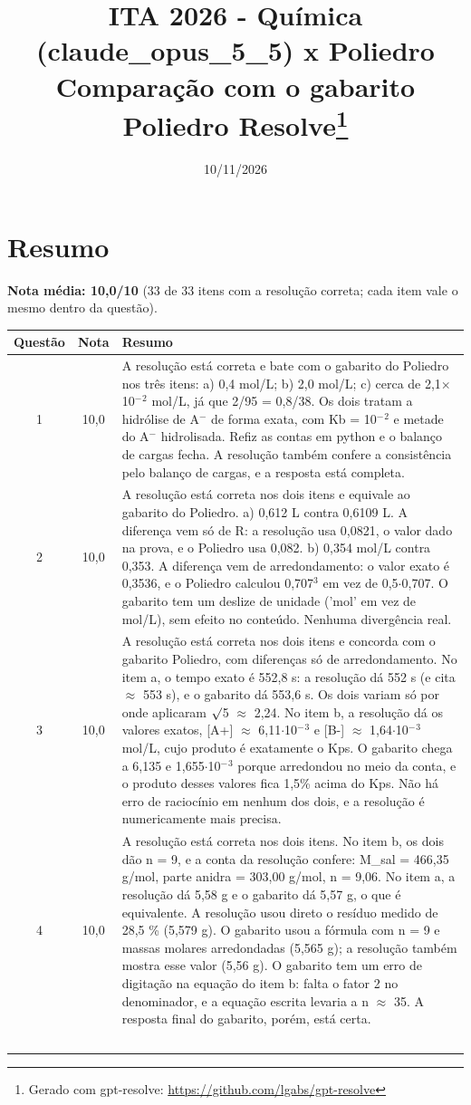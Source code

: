\documentclass{article}%
\title{ITA 2026 {-} Química (claude\_opus\_5\_5) x Poliedro\\[4pt]\large Comparação com o gabarito Poliedro Resolve\thanks{Gerado com gpt-resolve: \url{https://github.com/lgabs/gpt-resolve}}}%
\date{10/11/2026}%
\begin{document}
%
\normalsize%
\maketitle%
\section*{Resumo}\textbf{Nota média: 10,0/10} (33 de 33 itens com a resolução correta; cada item vale o mesmo dentro da questão).\par\medskip%
\begin{longtable}{@{}c c p{}@{}}\toprule Questão & Nota & Resumo \\ \midrule
1 & 10,0 & A resolução está correta e bate com o gabarito do Poliedro nos três itens: a) 0,4 mol/L; b) 2,0 mol/L; c) cerca de 2,1$\times$10$^{-}$$^2$ mol/L, já que 2/95 = 0,8/38. Os dois tratam a hidrólise de A$^{-}$ de forma exata, com Kb = 10$^{-}$$^2$ e metade do A$^{-}$ hidrolisada. Refiz as contas em python e o balanço de cargas fecha. A resolução também confere a consistência pelo balanço de cargas, e a resposta está completa. \\
2 & 10,0 & A resolução está correta nos dois itens e equivale ao gabarito do Poliedro. a) 0,612 L contra 0,6109 L. A diferença vem só de R: a resolução usa 0,0821, o valor dado na prova, e o Poliedro usa 0,082. b) 0,354 mol/L contra 0,353. A diferença vem de arredondamento: o valor exato é 0,3536, e o Poliedro calculou 0,707$^3$ em vez de 0,5$\cdot$0,707. O gabarito tem um deslize de unidade ('mol' em vez de mol/L), sem efeito no conteúdo. Nenhuma divergência real. \\
3 & 10,0 & A resolução está correta nos dois itens e concorda com o gabarito Poliedro, com diferenças só de arredondamento. No item a, o tempo exato é 552,8 s: a resolução dá 552 s (e cita $\approx$ 553 s), e o gabarito dá 553,6 s. Os dois variam só por onde aplicaram $\surd$5 $\approx$ 2,24. No item b, a resolução dá os valores exatos, {[}A+{]} $\approx$ 6,11$\cdot$10$^{-}$$^3$ e {[}B-{]} $\approx$ 1,64$\cdot$10$^{-}$$^3$ mol/L, cujo produto é exatamente o Kps. O gabarito chega a 6,135 e 1,655$\cdot$10$^{-}$$^3$ porque arredondou no meio da conta, e o produto desses valores fica 1,5\% acima do Kps. Não há erro de raciocínio em nenhum dos dois, e a resolução é numericamente mais precisa. \\
4 & 10,0 & A resolução está correta nos dois itens. No item b, os dois dão n = 9, e a conta da resolução confere: M\_sal = 466,35 g/mol, parte anidra = 303,00 g/mol, n = 9,06. No item a, a resolução dá 5,58 g e o gabarito dá 5,57 g, o que é equivalente. A resolução usou direto o resíduo medido de 28,5 \% (5,579 g). O gabarito usou a fórmula com n = 9 e massas molares arredondadas (5,565 g); a resolução também mostra esse valor (5,56 g). O gabarito tem um erro de digitação na equação do item b: falta o fator 2 no denominador, e a equação escrita levaria a n $\approx$ 35. A resposta final do gabarito, porém, está certa. \\
$$
\end{longtable}
\end{document}
